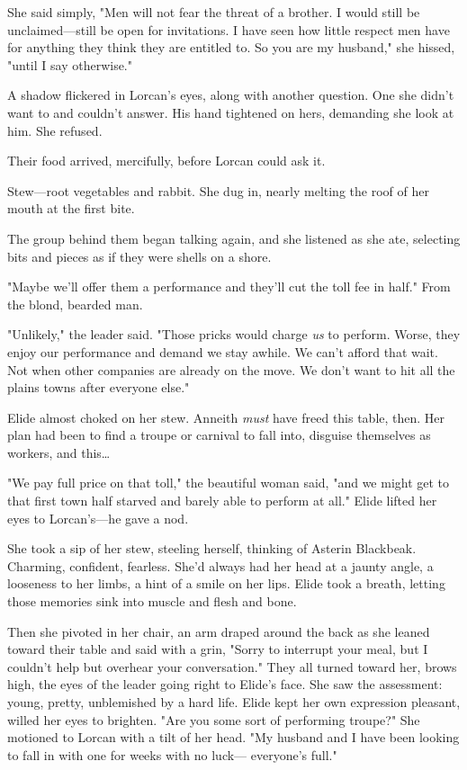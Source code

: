 She said simply, "Men will not fear the threat of a brother. I would still be unclaimed---still be open for  invitations. I have seen how little respect men have for anything they think they are entitled to. So you are my husband," she hissed, "until I say otherwise."

A shadow flickered in Lorcan's eyes, along with another question. One she didn't want to and couldn't answer. His hand tightened on hers, demanding she look at him. She refused.

Their food arrived, mercifully, before Lorcan could ask it.

Stew---root vegetables and rabbit. She dug in, nearly melting the roof of her mouth at the first bite.

The group behind them began talking again, and she listened as she ate, selecting bits and pieces as if they were shells on a shore.

"Maybe we'll offer them a performance and they'll cut the toll fee in half." From the blond, bearded man.

"Unlikely," the leader said. "Those pricks would charge \emph{us} to perform. Worse, they enjoy our performance and demand we stay awhile. We can't afford that wait. Not when other companies are already on the move. We don't want to hit all the plains towns after everyone else."

Elide almost choked on her stew. Anneith \emph{must} have freed this table, then. Her plan had been to find a troupe or carnival to fall into, disguise themselves as workers, and this\ldots{}

"We pay full price on that toll," the beautiful woman said, "and we might get to that first town half starved and barely able to perform at all." Elide lifted her eyes to Lorcan's---he gave a nod.

She took a sip of her stew, steeling herself, thinking of Asterin Blackbeak. Charming, confident, fearless. She'd always had her head at a jaunty angle, a looseness to her limbs, a hint of a smile on her lips. Elide took a breath, letting those memories sink into muscle and flesh and bone.

Then she pivoted in her chair, an arm draped around the back as she leaned toward their table and said with a grin, "Sorry to interrupt your meal, but I couldn't help but overhear your conversation." They all turned toward her, brows high, the eyes of the leader going right to Elide's face. She saw the assessment: young, pretty, unblemished by a hard life. Elide kept her own expression pleasant, willed her eyes to brighten. "Are you some sort of performing troupe?" She motioned to Lorcan with a tilt of her head. "My husband and I have been looking to fall in with one for weeks with no luck--- everyone's full."

